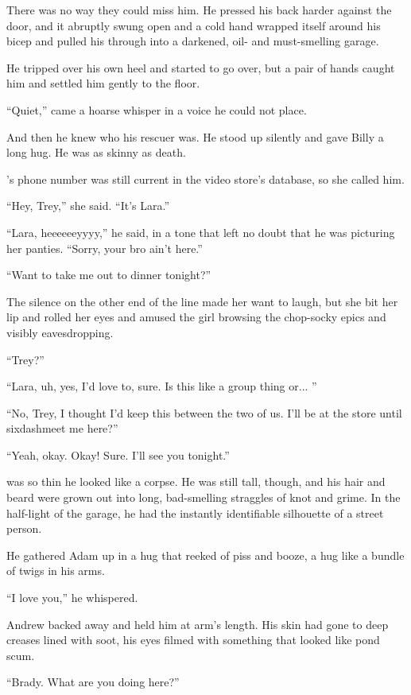 There was no way they could miss him.  He pressed his back harder
against the door, and it abruptly swung open and a cold hand wrapped
itself around his bicep and pulled his through into a darkened, oil-
and must-smelling garage.

He tripped over his own heel and started to go over, but a pair of
hands caught him and settled him gently to the floor.

``Quiet,'' came a hoarse whisper in a voice he could not place.

And then he knew who his rescuer was.  He stood up silently and gave
Billy a long hug.  He was as skinny as death.

's phone number was still current in the video store's database,
so she called him.

``Hey, Trey,'' she said.  ``It's Lara.''

``Lara, heeeeeeyyyy,'' he said, in a tone that left no doubt that he
was picturing her panties.  ``Sorry, your bro ain't here.''

``Want to take me out to dinner tonight?''

The silence on the other end of the line made her want to laugh, but
she bit her lip and rolled her eyes and amused the girl browsing the
chop-socky epics and visibly eavesdropping.

``Trey?''

``Lara, uh, yes, I'd love to, sure.  Is this like a group thing or... 
''

``No, Trey, I thought I'd keep this between the two of us.  I'll be at
the store until sixdash{}meet me here?''

``Yeah, okay.  Okay!  Sure.  I'll see you tonight.''

 was so thin he looked like a corpse.  He was still tall, though,
and his hair and beard were grown out into long, bad-smelling
straggles of knot and grime.  In the half-light of the garage, he had
the instantly identifiable silhouette of a street person.

He gathered Adam up in a hug that reeked of piss and booze, a hug like
a bundle of twigs in his arms.

``I love you,'' he whispered.

Andrew backed away and held him at arm's length.  His skin had gone to
deep creases lined with soot, his eyes filmed with something that
looked like pond scum.

``Brady.  What are you doing here?''

